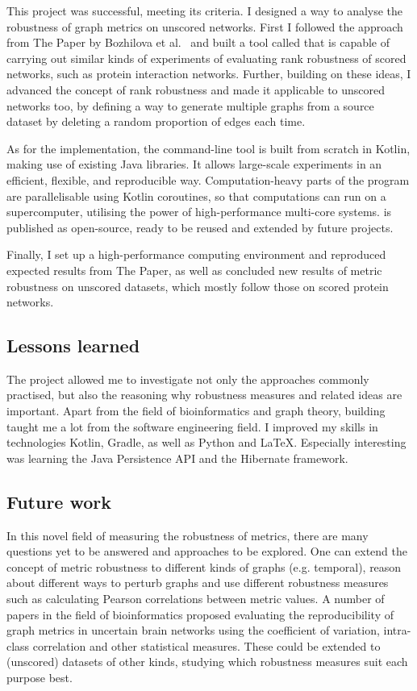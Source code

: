 This project was successful, meeting its criteria.
I designed a way to analyse the robustness of graph metrics on unscored networks.
First I followed the approach from The Paper by Bozhilova et al.~\cite{Bozhilova2019} and built a tool called \graffs that is capable of carrying out similar kinds of experiments of evaluating rank robustness of scored networks, such as protein interaction networks.
Further, building on these ideas, I advanced the concept of rank robustness and made it applicable to unscored networks too, by defining a way to generate multiple graphs from a source dataset by deleting a random proportion of edges each time.

As for the implementation, the command-line tool \graffs is built from scratch in Kotlin, making use of existing Java libraries.
It allows large-scale experiments in an efficient, flexible, and reproducible way.
Computation-heavy parts of the program are parallelisable using Kotlin coroutines, so that computations can run on a supercomputer, utilising the power of high-performance multi-core systems.
\graffs is published as open-source, ready to be reused and extended by future projects.

Finally, I set up a high-performance computing environment and reproduced expected results from The Paper, as well as concluded new results of metric robustness on unscored datasets, which mostly follow those on scored protein networks.


\subsection*{Lessons learned}

The project allowed me to investigate not only the approaches commonly practised, but also the reasoning why robustness measures and related ideas are important.
Apart from the field of bioinformatics and graph theory, building \graffs taught me a lot from the software engineering field.
I improved my skills in technologies Kotlin, Gradle, as well as Python and LaTeX.
Especially interesting was learning the Java Persistence API and the Hibernate framework.


\subsection*{Future work}

In this novel field of measuring the robustness of metrics, there are many questions yet to be answered and approaches to be explored.
One can extend the concept of metric robustness to different kinds of graphs (e.g. temporal), reason about different ways to perturb graphs and use different robustness measures such as calculating Pearson correlations between metric values.
A number of papers in the field of bioinformatics proposed evaluating the reproducibility of graph metrics in uncertain brain networks using the coefficient of variation, intra-class correlation and other statistical measures.
These could be extended to (unscored) datasets of other kinds, studying which robustness measures suit each purpose best.


